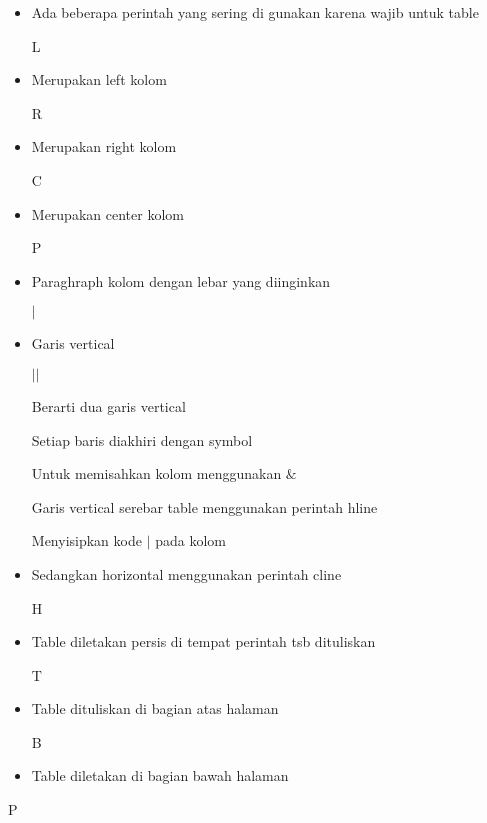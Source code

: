 \begin{itemize}
	
	\item Ada beberapa perintah yang sering di gunakan karena wajib untuk table\par

L\par

	\item Merupakan left kolom\par

R\par

	\item Merupakan right kolom\par

C\par

	\item Merupakan center kolom\par

P\par

	\item Paraghraph kolom dengan lebar yang diinginkan\par

$ \vert $\par

	\item Garis vertical\par

$ \vert $$ \vert $\par

Berarti dua garis vertical\par

Setiap baris diakhiri dengan symbol \par

Untuk memisahkan kolom menggunakan $\&$\par

Garis vertical serebar table menggunakan perintah hline\par

Menyisipkan kode $ \vert $ pada kolom\par

	\item Sedangkan horizontal menggunakan perintah cline\par

H\par

	\item Table diletakan persis di tempat perintah tsb dituliskan\par

T\par

	\item Table dituliskan di bagian atas halaman\par

B\par

	\item Table diletakan di bagian bawah halaman\par 

\end{itemize}
P\par

